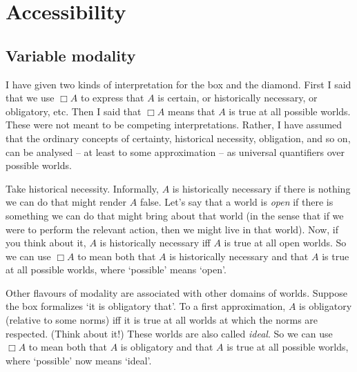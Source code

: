 \chapter{Accessibility}\label{ch:accessibility}

\section{Variable modality}

I have given two kinds of interpretation for the box and the diamond. First I
said that we use $\Box A$ to express that $A$ is certain, or historically
necessary, or obligatory, etc. Then I said that $\Box A$ means that $A$ is true
at all possible worlds. These were not meant to be competing interpretations.
Rather, I have assumed that the ordinary concepts of certainty, historical
necessity, obligation, and so on, can be analysed -- at least to some
approximation -- as universal quantifiers over possible worlds.

Take historical necessity. Informally, $A$ is historically necessary if there is
nothing we can do that might render $A$ false. Let's say that a world is
\emph{open} if there is something we can do that might bring about that world
(in the sense that if we were to perform the relevant action, then we might live
in that world). Now, if you think about it, $A$ is historically necessary iff
$A$ is true at all open worlds. So we can use $\Box A$ to mean both that $A$ is
historically necessary and that $A$ is true at all possible worlds, where
`possible' means `open'.

Other flavours of modality are associated with other domains of worlds. Suppose
the box formalizes `it is obligatory that'. To a first approximation, $A$ is
obligatory (relative to some norms) iff it is true at all worlds at which the
norms are respected. (Think about it!) These worlds are also called
\emph{ideal}. So we can use $\Box A$ to mean both that $A$ is obligatory and
that $A$ is true at all possible worlds, where `possible' now means `ideal'.

